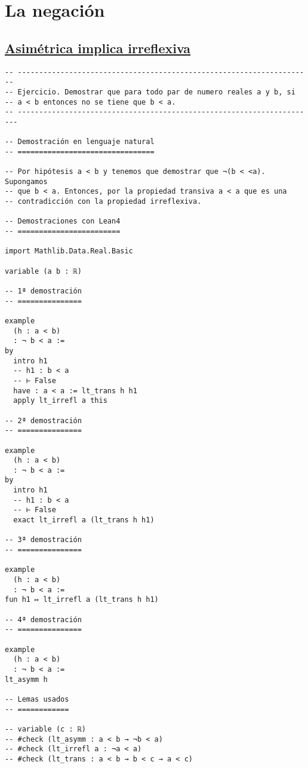 \section{La negación}
\label{sec:org34e9872}

\subsection{\href{./src/Logica/Asimetrica\_implica\_irreflexiva.lean}{Asimétrica implica irreflexiva}}
\label{sec:orged16ef4}
\begin{verbatim}
-- ---------------------------------------------------------------------
-- Ejercicio. Demostrar que para todo par de numero reales a y b, si
-- a < b entonces no se tiene que b < a.
-- ----------------------------------------------------------------------

-- Demostración en lenguaje natural
-- ================================

-- Por hipótesis a < b y tenemos que demostrar que ¬(b < <a). Supongamos
-- que b < a. Entonces, por la propiedad transiva a < a que es una
-- contradicción con la propiedad irreflexiva.

-- Demostraciones con Lean4
-- ========================

import Mathlib.Data.Real.Basic

variable (a b : ℝ)

-- 1ª demostración
-- ===============

example
  (h : a < b)
  : ¬ b < a :=
by
  intro h1
  -- h1 : b < a
  -- ⊢ False
  have : a < a := lt_trans h h1
  apply lt_irrefl a this

-- 2ª demostración
-- ===============

example
  (h : a < b)
  : ¬ b < a :=
by
  intro h1
  -- h1 : b < a
  -- ⊢ False
  exact lt_irrefl a (lt_trans h h1)

-- 3ª demostración
-- ===============

example
  (h : a < b)
  : ¬ b < a :=
fun h1 ↦ lt_irrefl a (lt_trans h h1)

-- 4ª demostración
-- ===============

example
  (h : a < b)
  : ¬ b < a :=
lt_asymm h

-- Lemas usados
-- ============

-- variable (c : ℝ)
-- #check (lt_asymm : a < b → ¬b < a)
-- #check (lt_irrefl a : ¬a < a)
-- #check (lt_trans : a < b → b < c → a < c)
\end{verbatim}

